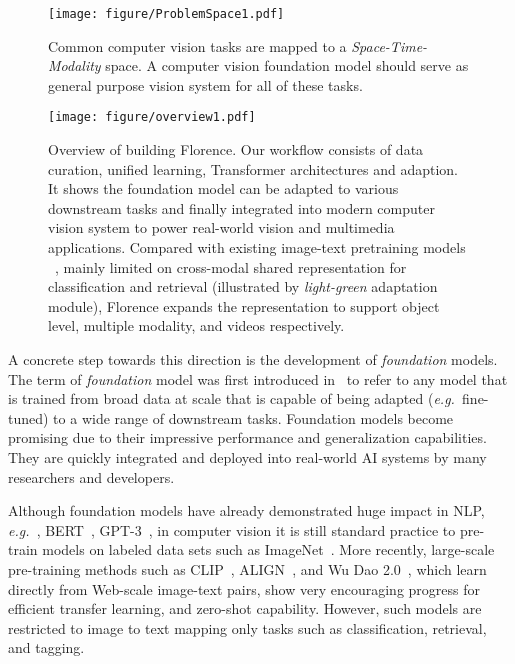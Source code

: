 \documentclass{article}
\newcommand{\eg}{{\it{e.g.}~}}
\begin{document}
\begin{figure}[t]
  \centering
   \texttt{[image: figure/ProblemSpace1.pdf]}
  \caption{Common computer vision tasks are mapped to a \emph{Space-Time-Modality} space. A computer vision foundation model should serve as general purpose vision system for all of these tasks.}
  \label{fig:problem}
\end{figure}

\begin{figure*}[t]
  \centering
   \texttt{[image: figure/overview1.pdf]}
  \caption{Overview of building Florence. Our workflow consists of data curation, unified learning,
  Transformer architectures and adaption. It shows the foundation model can be adapted to various
  downstream tasks and finally integrated into modern computer vision system to power real-world
  vision and multimedia applications. Compared with existing image-text pretraining models ~\cite{radford2021learning,jia2021scaling,Wudao2}, mainly limited on cross-modal shared representation for classification and retrieval (illustrated by \emph{light-green} adaptation module), Florence expands the representation to support object level, multiple modality, and videos respectively.}
  \label{fig:overview}
\end{figure*}

A concrete step towards this direction is the development of \emph{foundation} models. The term of \emph{foundation} model was first introduced in~\cite{bommasani2021opportunities} to refer to any model that is trained from broad data at scale that is capable of being adapted (\eg fine-tuned) to a wide range of downstream tasks. Foundation models become promising due to their impressive performance and generalization capabilities. They are quickly integrated and deployed into real-world AI systems by many researchers and developers.

Although foundation models have already demonstrated huge impact in NLP, \eg, BERT~\cite{devlin2019bert}, GPT-3~\cite{brown2020language}, in computer vision it is still standard practice to pre-train models on labeled data sets such as ImageNet~\cite{deng2009imagenet}. More recently, large-scale pre-training methods such as CLIP~\cite{radford2021learning}, ALIGN~\cite{jia2021scaling}, and Wu Dao 2.0~\cite{Wudao2}, which learn directly from Web-scale image-text pairs, show very encouraging progress for efficient transfer learning, and zero-shot capability. However, such models are restricted to image to text mapping only tasks such as classification, retrieval, and tagging.
\end{document}
